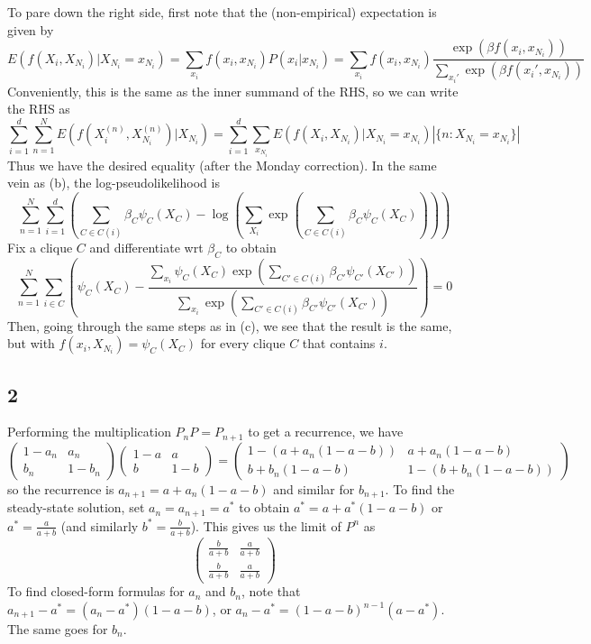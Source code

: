 \documentclass{article}
\newcommand{\openm}{\begin{pmatrix}}
\newcommand{\closem}{\end{pmatrix}}
\begin{document}
To pare down the right side, first note that the (non-empirical) expectation is given by
\[E(f(X_i,X_{N_i})|X_{N_i}=x_{N_i})=\sum_{x_i}f(x_i,x_{N_i})P(x_i|x_{N_i})=\sum_{x_i}f(x_i, x_{N_i})\frac{\exp\left(\beta f(x_i,x_{N_i})\right)}{\sum_{x_i'}\exp\left(\beta f(x_i',x_{N_i})\right)}\]
Conveniently, this is the same as the inner summand of the RHS, so we can write the RHS as
\[\sum_{i=1}^d\sum_{n=1}^NE(f(X_i^{(n)},X_{N_i}^{(n)})|X_{N_i})=\sum_{i=1}^d\sum_{x_{N_i}}E(f(X_i,X_{N_i})|X_{N_i}=x_{N_i})\left|\{n:X_{N_i}=x_{N_i}\}\right|\]
Thus we have the desired equality (after the Monday correction).
In the same vein as (b), the log-pseudolikelihood is
\[\sum_{n=1}^N\sum_{i=1}^d\left(\sum_{C\in C(i)}\beta_C\psi_{C}(X_{C})-\log\left(\sum_{X_i}\exp\left(\sum_{C\in C(i)}\beta_C\psi_C(X_C)\right)\right)\right)\]
Fix a clique $C$ and differentiate wrt $\beta_C$ to obtain
\[\sum_{n=1}^N\sum_{i\in C}\left(\psi_C(X_C)-\frac{\sum_{x_i}\psi_C(X_C)\exp\left(\sum_{C'\in C(i)}\beta_{C'}\psi_{C'}(X_{C'})\right)}{\sum_{x_i}\exp\left(\sum_{C'\in C(i)}\beta_{C'}\psi_{C'}(X_{C'})\right)}\right)=0\]
Then, going through the same steps as in (c), we see that the result is the same, but with $f(x_i,X_{N_i})=\psi_C(X_C)$ for every clique $C$ that contains $i$.
\subsection*{2}
Performing the multiplication $P_nP=P_{n+1}$ to get a recurrence, we have
\[\openm1-a_n&a_n\\b_n&1-b_n\closem\openm1-a&a\\b&1-b\closem=\openm1-(a+a_n(1-a-b))&a+a_n(1-a-b)\\b+b_n(1-a-b)&1-(b+b_n(1-a-b))\closem\]
so the recurrence is $a_{n+1}=a+a_n(1-a-b)$ and similar for $b_{n+1}$. To find the steady-state solution, set $a_n=a_{n+1}=a^*$ to obtain $a^*=a+a^*(1-a-b)$ or $a^*=\frac{a}{a+b}$ (and similarly $b^*=\frac{b}{a+b}$). This gives us the limit of $P^n$ as 
\[\openm\frac{b}{a+b}&\frac{a}{a+b}\\\frac{b}{a+b}&\frac{a}{a+b}\closem\]
To find closed-form formulas for $a_n$ and $b_n$, note that $a_{n+1}-a^*=(a_n-a^*)(1-a-b)$, or $a_n-a^*=(1-a-b)^{n-1}(a-a^*)$. The same goes for $b_n$.
\end{document}
